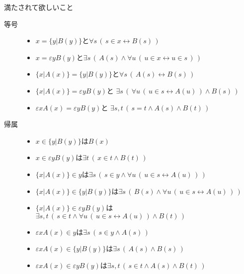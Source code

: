 \documentclass[a4j,10.5pt,oneside,openany]{jsbook}
\theoremstyle{mystyle}
\begin{document}
	\begin{itembox}[l]{満たされて欲しいこと}
		\begin{description}
			\item[等号]
				\begin{itemize}
					\item $x = \{y|B(y)\}$と$\forall s\, \left(\, s \in x \leftrightarrow B(s)\, \right)$
					\item $x = \varepsilon y B(y)$と$\exists s\, \left(\, A(s) \wedge \forall u\,
						\left(\, u \in x \leftrightarrow u \in s\, \right)\, \right)$
					\item $\{x|A(x)\} = \{y|B(y)\}$と$\forall s\, \left(\, A(s) \leftrightarrow B(s)\, \right)$
					\item $\{x|A(x)\} = \varepsilon y B(y)$と
						$\exists s\, \left(\, \forall u\,
						\left(\, u \in s \leftrightarrow A(u)\, \right) \wedge B(s)\, \right)$
					\item $\varepsilon x A(x) = \varepsilon y B(y)$と
						$\exists s,t\, \left(\, s = t \wedge A(s) \wedge B(t)\, \right)$
				\end{itemize}
				
			\item[帰属]
				\begin{itemize}
					\item $x \in \{y|B(y)\}$は$B(x)$
					\item $x \in \varepsilon y B(y)$は$\exists t\, \left(\, x \in t \wedge B(t)\, \right)$
					\item $\{x|A(x)\} \in y$は$\exists s\, \left(\, s \in y \wedge \forall u\, \left(\, u \in s \leftrightarrow A(u)\, \right)\, \right)$
					\item $\{x|A(x)\} \in \{y|B(y)\}$は$\exists s\, \left(\, B(s) \wedge \forall u\, \left(\, u \in s \leftrightarrow A(u)\, \right)\, \right)$
					\item $\{x|A(x)\} \in \varepsilon y B(y)$は$\exists s,t\, \left(\, s \in t \wedge \forall u\, \left(\, u \in s \leftrightarrow A(u)\, \right) \wedge B(t)\, \right)$
					\item $\varepsilon x A(x) \in y$は$\exists s\, \left(\, s \in y \wedge A(s)\, \right)$
					\item $\varepsilon x A(x) \in \{y|B(y)\}$は$\exists s\, \left(\, A(s) \wedge B(s)\, \right)$
					\item $\varepsilon x A(x) \in \varepsilon y B(y)$は$\exists s,t\, \left(\, s \in t \wedge A(s) \wedge B(t)\, \right)$
				\end{itemize}
		\end{description}
	\end{itembox}
\end{document}
